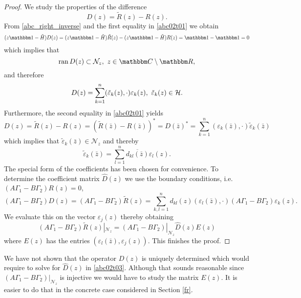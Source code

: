 \begin{proof}
We study the properties of the difference
\begin{equation*}
  D(z) = \tilde R(z) - R(z) .
\end{equation*}
From \eqref{abc_right_inverse} and the first equality in \eqref{abc02t01} we obtain
\begin{equation*}
  (z\id-\tilde H) D(z) = (z\id-\tilde H)\tilde R(z) - (z\id-\tilde H)R(z) = \id -\id = 0
\end{equation*}
which implies that
\begin{equation*}
  \ran D(z)\subset\mathcal{N}_z,\ z\in\C\setminus\R ,
\end{equation*}
and therefore
\begin{equation*}
  D(z) = \sum_{k=1}^n (\tilde\varepsilon_k(z),\cdot)\varepsilon_k(z),\ \tilde\varepsilon_k(z)\in\hilbert .
\end{equation*}
Furthermore, the second equality in \eqref{abc02t01} yields
\begin{equation*}
  D(z) = \tilde R(z) - R(z)
       = ( \tilde R(\bar z) - R(\bar z) )^*
       = D(\bar z)^*
       = \sum_{k=1}^n (\varepsilon_k(\bar z),\cdot)\tilde\varepsilon_k(\bar z)
\end{equation*}
which implies that $\tilde\varepsilon_k(\bar z)\in\mathcal{N}_z$ and thereby
\begin{equation*}
  \tilde\varepsilon_k(\bar z) = \sum_{l=1}^n \overline{d_{kl}(\bar z)} \varepsilon_l(z) .
\end{equation*}
The special form of the coefficients has been chosen for convenience.
To determine the coefficient matrix $\hat D(z)$ we use the boundary conditions, i.e. $(A\Gamma_1-B\Gamma_2)R(z)=0$,
\begin{equation*}
  (A\Gamma_1-B\Gamma_2) D(z)
    = (A\Gamma_1-B\Gamma_2)\tilde R(z)
    = \sum_{k,l=1}^n d_{kl}(z)(\varepsilon_l(\bar z),\cdot)(A\Gamma_1-B\Gamma_2)\varepsilon_k(z) .
\end{equation*}
We evaluate this on the vector $\varepsilon_j(z)$ thereby obtaining
\begin{equation*}
  (A\Gamma_1-B\Gamma_2)\tilde R(z)|_{\mathcal{N}_z} = (A\Gamma_1-B\Gamma_2)|_{\mathcal{N}_z} \hat D(z) E(z)
\end{equation*}
where $E(z)$ has the entries $(\varepsilon_l(\bar z), \varepsilon_j(z))$. This finishes the proof.
\end{proof}

We have not shown that the operator $D(z)$ is uniquely determined which would require to solve
for $\hat D(z)$ in \eqref{abc02t03}. Although that sounds reasonable since $(A\Gamma_1-B\Gamma_2)|_{\mathcal{N}_z}$ is injective
we would have to study the matrix $E(z)$. It is easier to do that in the concrete case 
considered in Section \ref{fr}.
